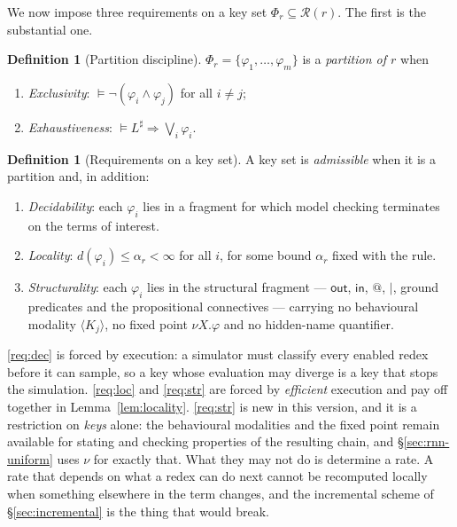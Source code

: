 \documentclass[11pt,a4paper]{article}
\theoremstyle{plain}
\theoremstyle{definition}
\newtheorem{definition}[theorem]{Definition}
\theoremstyle{remark}
\newcommand{\sepc}{\mathbin{\big|}}
\newcommand{\out}{\mathsf{out}}
\newcommand{\inn}{\mathsf{in}}
\newcommand{\dpt}{d}
\begin{document}
We now impose three requirements on a key set $\Phi_r \subseteq \mathcal{R}(r)$. The first is the
substantial one.

\begin{definition}[Partition discipline]
\label{def:partition}
$\Phi_r = \{\varphi_1, \ldots, \varphi_m\}$ is a \emph{partition of $r$} when
\begin{enumerate}[label=(P\arabic*),leftmargin=3em]
\item \emph{Exclusivity}: $\models \neg(\varphi_i \wedge \varphi_j)$ for all $i \neq j$;
\item \emph{Exhaustiveness}: $\models L^\sharp \Rightarrow \bigvee_{i} \varphi_i$.
\end{enumerate}
\end{definition}

\begin{definition}[Requirements on a key set]
\label{def:reqs}
A key set is \emph{admissible} when it is a partition and, in addition:
\begin{enumerate}[label=(R\arabic*),leftmargin=3em]
\item\label{req:dec} \emph{Decidability}: each $\varphi_i$ lies in a fragment for which model
checking terminates on the terms of interest.
\item\label{req:loc} \emph{Locality}: $\dpt(\varphi_i) \le \alpha_r < \infty$ for all $i$, for some
bound $\alpha_r$ fixed with the rule.
\item\label{req:str} \emph{Structurality}: each $\varphi_i$ lies in the structural fragment ---
$\out$, $\inn$, $@$, $\sepc$, ground predicates and the propositional connectives --- carrying no
behavioural modality $\langle K_j\rangle$, no fixed point $\nu X.\varphi$ and no hidden-name
quantifier.
\end{enumerate}
\end{definition}

\ref{req:dec} is forced by execution: a simulator must classify every enabled redex before it can
sample, so a key whose evaluation may diverge is a key that stops the simulation. \ref{req:loc} and
\ref{req:str} are forced by \emph{efficient} execution and pay off together in
Lemma~\ref{lem:locality}. \ref{req:str} is new in this version, and it is a restriction on
\emph{keys} alone: the behavioural modalities and the fixed point remain available for stating and
checking properties of the resulting chain, and \S\ref{sec:rnn-uniform} uses $\nu$ for exactly that.
What they may not do is determine a rate. A rate that depends on what a redex can do next cannot be
recomputed locally when something elsewhere in the term changes, and the incremental scheme of
\S\ref{sec:incremental} is the thing that would break.
\end{document}
